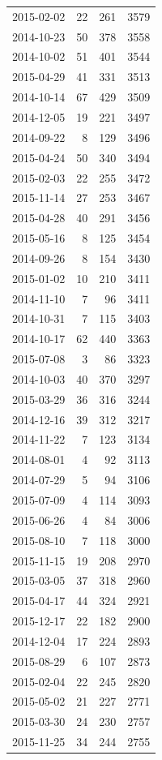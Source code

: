 \begin{tabular}{lrrr}
2015-02-02 & 22 & 261 & 3579 \\
2014-10-23 & 50 & 378 & 3558 \\
2014-10-02 & 51 & 401 & 3544 \\
2015-04-29 & 41 & 331 & 3513 \\
2014-10-14 & 67 & 429 & 3509 \\
2014-12-05 & 19 & 221 & 3497 \\
2014-09-22 & 8 & 129 & 3496 \\
2015-04-24 & 50 & 340 & 3494 \\
2015-02-03 & 22 & 255 & 3472 \\
2015-11-14 & 27 & 253 & 3467 \\
2015-04-28 & 40 & 291 & 3456 \\
2015-05-16 & 8 & 125 & 3454 \\
2014-09-26 & 8 & 154 & 3430 \\
2015-01-02 & 10 & 210 & 3411 \\
2014-11-10 & 7 & 96 & 3411 \\
2014-10-31 & 7 & 115 & 3403 \\
2014-10-17 & 62 & 440 & 3363 \\
2015-07-08 & 3 & 86 & 3323 \\
2014-10-03 & 40 & 370 & 3297 \\
2015-03-29 & 36 & 316 & 3244 \\
2014-12-16 & 39 & 312 & 3217 \\
2014-11-22 & 7 & 123 & 3134 \\
2014-08-01 & 4 & 92 & 3113 \\
2014-07-29 & 5 & 94 & 3106 \\
2015-07-09 & 4 & 114 & 3093 \\
2015-06-26 & 4 & 84 & 3006 \\
2015-08-10 & 7 & 118 & 3000 \\
2015-11-15 & 19 & 208 & 2970 \\
2015-03-05 & 37 & 318 & 2960 \\
2015-04-17 & 44 & 324 & 2921 \\
2015-12-17 & 22 & 182 & 2900 \\
2014-12-04 & 17 & 224 & 2893 \\
2015-08-29 & 6 & 107 & 2873 \\
2015-02-04 & 22 & 245 & 2820 \\
2015-05-02 & 21 & 227 & 2771 \\
2015-03-30 & 24 & 230 & 2757 \\
2015-11-25 & 34 & 244 & 2755 \\

\end{tabular}
